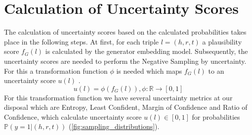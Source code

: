 \section{Calculation of Uncertainty Scores}
\label{sec:calculation_of_uncertainty_scores}
The calculation of uncertainty scores based on the calculated probabilities takes place in the following steps.
At first, for each triple $l = (h, r, t)$ a plausibility score $f_G(l)$ is calculated by the generator embedding model. 
Subsequently, the uncertainty scores are needed to perform the Negative Sampling by uncertainty.
For this a transformation function $\phi$ is needed which maps $f_G(l)$ to an uncertainty score $u(l)$ .
\begin{equation} \label{eqn:uncertainty_function}
    u(l) = \phi(f_G(l)), \phi: \mathbb{R} \rightarrow [0,1]
\end{equation}
For this transformation function we have several uncertainty metrics at our disposal which are Entropy, Least Confident, Margin of Confidence and Ratio of Confidence, which calculate uncertainty score $u(l) \in [0, 1]$ for probabilities $\mathbb{P}(y = 1 | (h,r,t))$ (\autoref{fig:sampling_distributions}).

